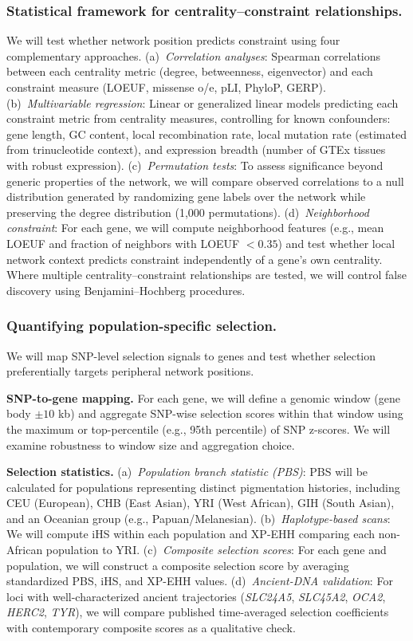 \documentclass[11pt]{article}
\begin{document}
\subsubsection{Statistical framework for centrality--constraint relationships.}
We will test whether network position predicts constraint using four complementary approaches. (a)~\emph{Correlation analyses}: Spearman correlations between each centrality metric (degree, betweenness, eigenvector) and each constraint measure (LOEUF, missense o/e, pLI, PhyloP, GERP). (b)~\emph{Multivariable regression}: Linear or generalized linear models predicting each constraint metric from centrality measures, controlling for known confounders: gene length, GC content, local recombination rate, local mutation rate (estimated from trinucleotide context), and expression breadth (number of GTEx tissues with robust expression). (c)~\emph{Permutation tests}: To assess significance beyond generic properties of the network, we will compare observed correlations to a null distribution generated by randomizing gene labels over the network while preserving the degree distribution (1{,}000 permutations). (d)~\emph{Neighborhood constraint}: For each gene, we will compute neighborhood features (e.g., mean LOEUF and fraction of neighbors with LOEUF $< 0.35$) and test whether local network context predicts constraint independently of a gene's own centrality. Where multiple centrality--constraint relationships are tested, we will control false discovery using Benjamini--Hochberg procedures.

\subsubsection{Quantifying population-specific selection.}
We will map SNP-level selection signals to genes and test whether selection preferentially targets peripheral network positions.

\textbf{SNP-to-gene mapping.} For each gene, we will define a genomic window (gene body $\pm 10$ kb) and aggregate SNP-wise selection scores within that window using the maximum or top-percentile (e.g., 95th percentile) of SNP z-scores. We will examine robustness to window size and aggregation choice.

\textbf{Selection statistics.} (a)~\emph{Population branch statistic (PBS)}: PBS will be calculated for populations representing distinct pigmentation histories, including CEU (European), CHB (East Asian), YRI (West African), GIH (South Asian), and an Oceanian group (e.g., Papuan/Melanesian). (b)~\emph{Haplotype-based scans}: We will compute iHS within each population and XP-EHH comparing each non-African population to YRI. (c)~\emph{Composite selection scores}: For each gene and population, we will construct a composite selection score by averaging standardized PBS, iHS, and XP-EHH values. (d)~\emph{Ancient-DNA validation}: For loci with well-characterized ancient trajectories (\emph{SLC24A5}, \emph{SLC45A2}, \emph{OCA2}, \emph{HERC2}, \emph{TYR}), we will compare published time-averaged selection coefficients with contemporary composite scores as a qualitative check.
\end{document}
